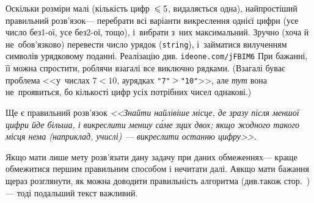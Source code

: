 
Оскільки розміри малі (кількість цифр~$\leqslant5$, видаляється одна), найпростіший правильний розв’язок\nolinebreak[3] --- перебрати всі варіанти викреслення однієї цифри (усе число без\nolinebreak[3] \mbox{1-ої}, усе без\nolinebreak[3] \mbox{2-ої}, тощо), і~вибрати з~них максимальний. Зручно (хоча й не~обов'язково) перевести число у\nolinebreak[3] рядок (\verb"string"), і~займатися вилученням символів у\nolinebreak[3] рядковому поданні. Реалізацію див. \verb"ideone.com/jFBIM6"\hspace{0.5em plus 1em}
При бажанні, її можна спростити, роблячи взагалі все виключно рядками. (Взагалі буває проблема <<у~числах ${7{<}10}$, а\nolinebreak[3] у\nolinebreak[3] рядках \verb|"7"|$\dib{{>}}$\verb|"10"|>>, але \emph{тут} вона не~проявиться, бо кількості цифр усіх потрібних чисел однакові.)

Ще є правильний розв’язок \textsl{<<Знайти найлівіше місце, де зразу після меншої цифри йде більша, і викреслити меншу с\'{а}ме з\nolinebreak[2] цих двох; якщо жодного такого місця нема (наприклад, у\nolinebreak[3] числі) --- викреслити останню цифру>>}.

Якщо мати лише мету розв'язати дану задачу при даних обмеженнях\nolinebreak[3] --- краще обмежитися першим правильним способом і не\nolinebreak[3] читати далі. А\nolinebreak[3] якщо мати бажання ще\nolinebreak[2] раз розглянути, як можна доводити правильність алгоритма (див.\nolinebreak[3] також стор.~\pageref{text:need-or-no-need-to-prove})\nolinebreak[3] --- тоді подальший текст важливий. 

